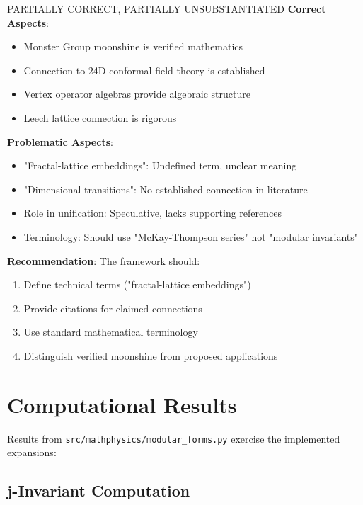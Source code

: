 \begin{factcheck}{PARTIALLY CORRECT, PARTIALLY UNSUBSTANTIATED}
\textbf{Correct Aspects}:
\begin{itemize}
    \item[+] Monster Group moonshine is verified mathematics
    \item[+] Connection to 24D conformal field theory is established
    \item[+] Vertex operator algebras provide algebraic structure
    \item[+] Leech lattice connection is rigorous
\end{itemize}

\textbf{Problematic Aspects}:
\begin{itemize}
    \item[$?$] "Fractal-lattice embeddings": Undefined term, unclear meaning
    \item[$?$] "Dimensional transitions": No established connection in literature
    \item[$?$] Role in unification: Speculative, lacks supporting references
    \item[$-$] Terminology: Should use "McKay-Thompson series" not "modular invariants"
\end{itemize}

\textbf{Recommendation}: The framework should:
\begin{enumerate}
    \item Define technical terms ("fractal-lattice embeddings")
    \item Provide citations for claimed connections
    \item Use standard mathematical terminology
    \item Distinguish verified moonshine from proposed applications
\end{enumerate}
\end{factcheck}

\section{Computational Results}

Results from \texttt{src/mathphysics/modular\_forms.py} exercise the implemented expansions:

\subsection{j-Invariant Computation}

